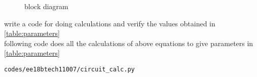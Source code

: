 \begin{enumerate}[label=\thesubsection.\arabic*.,ref=\thesubsection.\theenumi]
{\begin{figure}[!ht]
\begin{center}
		\resizebox{\columnwidth}{!}{}
	\end{center}
\caption{block diagram}
\label{fig:block_diagram}
\end{figure}
\item write a code for doing calculations and verify the values obtained in \ref{table:parameters} 
\\
\solution 
following code does all the calculations of above equations to give parameters in
\ref{table:parameters} 
\begin{lstlisting}
codes/ee18btech11007/circuit_calc.py
\end{lstlisting}
}%



\end{enumerate}
